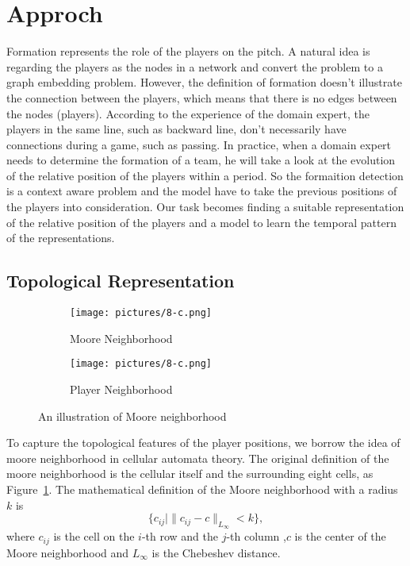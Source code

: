 \documentclass{article}
\begin{document}
\section{Approch}
Formation represents the role of the players on the pitch. A natural idea is regarding the players as the nodes in a network and convert the problem to a graph embedding problem. However, the definition of formation doesn't illustrate the connection between the players, which means that there is no edges between the nodes (players). According to the experience of the domain expert, the players in the same line, such as backward line, don't necessarily have connections during a game, such as passing. In practice, when a domain expert needs to determine the formation of a team, he will take a look at the evolution of the relative position of the players within a period. So the formaition detection is a context aware problem and the model have to take the previous positions of the players into consideration. Our task becomes finding a suitable representation of the relative position of the players and a model to learn the temporal pattern of the representations.

\subsection{Topological Representation}
\begin{figure}
    \centering
    \begin{subfigure}[b]{0.2\textwidth}
        \texttt{[image: pictures/8-c.png]}
        \caption{Moore Neighborhood}
        \label{fig:moore1}
    \end{subfigure}
    \begin{subfigure}[b]{0.2\textwidth}
        \texttt{[image: pictures/8-c.png]}
        \caption{Player Neighborhood}
        \label{fig:moore2}
    \end{subfigure}
    \caption{An illustration of Moore neighborhood}\label{fig:moores}
\end{figure}
To capture the topological features of the player positions, we borrow the idea of moore neighborhood in cellular automata theory. 
The original definition of the moore neighborhood is the cellular itself and the surrounding eight cells, as Figure~\ref{fig:moore1}. The mathematical definition of the Moore neighborhood with a radius $k$ is
\begin{equation}
    \{c_{ij}| \|c_{ij}-c\|_{L_{\infty}}<k\},
\end{equation}
where $c_{ij}$ is the cell on the $i$-th row and the $j$-th column ,$c$ is the center of the Moore neighborhood and $L_{\infty}$ is the Chebeshev distance.
\end{document}
